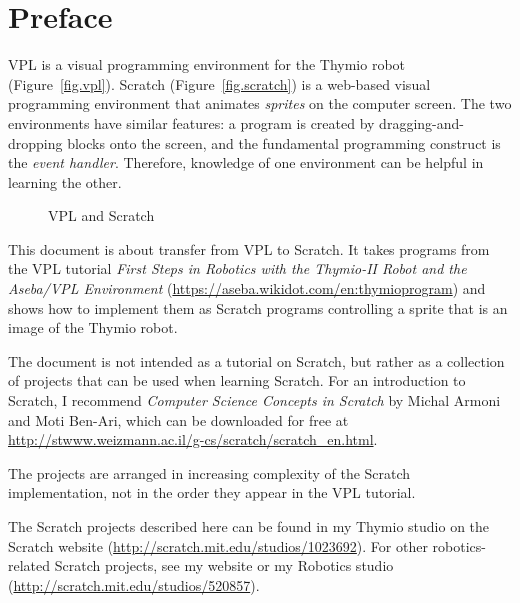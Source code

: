 \chapter*{Preface}


VPL is a visual programming environment for the Thymio robot
(Figure~\ref{fig.vpl}). Scratch (Figure~\ref{fig.scratch}) is a
web-based visual programming environment that animates \emph{sprites} on
the computer screen. The two environments have similar features: a
program is created by dragging-and-dropping blocks onto the screen, and
the fundamental programming construct is the \emph{event handler}.
Therefore, knowledge of one environment can be helpful in learning the
other.

\begin{figure}[hb]
\centering
	\hspace{1.5cm}
    \caption{VPL and Scratch}
    \label{fig.vplscratch}
\end{figure}

This document is about transfer from VPL to Scratch. It takes programs
from the VPL tutorial \emph{First Steps in Robotics with the Thymio-II
Robot and the Aseba/VPL Environment}
(\url{https://aseba.wikidot.com/en:thymioprogram}) and shows how to
implement them as Scratch programs controlling a sprite that is an
image of the Thymio robot.


The document is not intended as a tutorial on Scratch, but
rather as a collection of projects that can be used when learning
Scratch. For an introduction to Scratch, I recommend \textit{Computer
Science Concepts in Scratch} by Michal Armoni and Moti Ben-Ari, which
can be downloaded for free at
\url{http://stwww.weizmann.ac.il/g-cs/scratch/scratch_en.html}.

The projects are arranged in increasing complexity of the Scratch
implementation, not in the order they appear in the VPL tutorial.

The Scratch projects described here can be found in my Thymio studio on
the Scratch website (\url{http://scratch.mit.edu/studios/1023692}). For
other robotics-related Scratch projects, see my website or my Robotics
studio (\url{http://scratch.mit.edu/studios/520857}).

